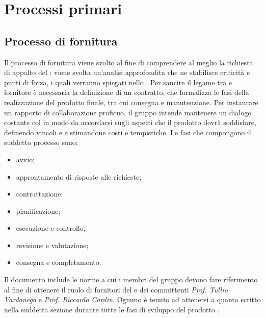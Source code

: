 \section{Processi primari}
\subsection{Processo di fornitura}

Il processo di fornitura viene svolto al fine di comprendere al meglio la richiesta di appalto del : viene svolta un'analisi approfondita che ne stabilisce criticità e punti di forza, i quali verranno spiegati nello \SdF{}. Per sancire il legame tra  e fornitore è necessaria la definizione di un contratto, che formalizza le fasi della realizzazione del prodotto finale, tra cui consegna e manutenzione. Per instaurare un rapporto di collaborazione proficuo, il gruppo intende mantenere un dialogo costante col  in modo da accordarsi sugli aspetti che il prodotto dovrà soddisfare, definendo vincoli e  e stimandone costi e tempistiche.
Le fasi che compongono il suddetto processo sono: 
\begin{itemize}
	\item avvio;
	\item approntamento di risposte alle richieste;
	\item contrattazione;
	\item pianificazione;
	\item esecuzione e controllo;
	\item revisione e valutazione;
	\item consegna e completamento.
\end{itemize}

Il documento include le norme a cui i membri del gruppo \Gruppo{} devono fare riferimento al fine di ottenere il ruolo di fornitori del  \proponente{} e dei committenti \textit{Prof. Tullio Vardanega} e \textit{Prof. Riccardo Cardin}. Ognuno è tenuto ad attenersi a quanto scritto nella suddetta sezione durante tutte le fasi di sviluppo del prodotto \progetto{}.

